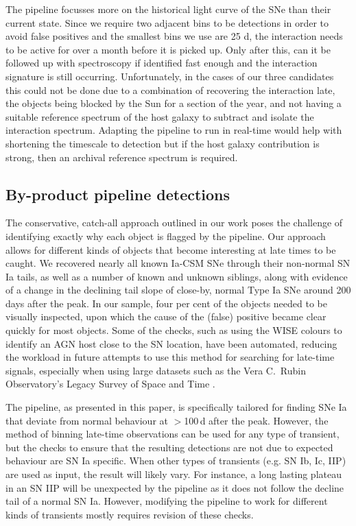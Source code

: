 \documentclass[a4paper,oneside,12pt, class=Latex/Classes/PhDthesisPSnPDF, crop=false]{standalone}
\begin{document}
The pipeline focusses more on the historical light curve of the SNe than their current state. Since we require two adjacent bins to be detections in order to avoid false positives and the smallest bins we use are 25 d, the interaction needs to be active for over a month before it is picked up. Only after this, can it be followed up with spectroscopy if identified fast enough and the interaction signature is still occurring. Unfortunately, in the cases of our three candidates this could not be done due to a combination of recovering the interaction late, the objects being blocked by the Sun for a section of the year, and not having a suitable reference spectrum of the host galaxy to subtract and isolate the interaction spectrum. Adapting the pipeline to run in real-time would help with shortening the timescale to detection but if the host galaxy contribution is strong, then an archival reference spectrum is required.

\subsection{By-product pipeline detections}
The conservative, catch-all approach outlined in our work poses the challenge of identifying exactly why each object is flagged by the pipeline. Our approach allows for different kinds of objects that become interesting at late times to be caught. We recovered nearly all known Ia-CSM SNe through their non-normal SN Ia tails, as well as a number of known and unknown siblings, along with evidence of a change in the declining tail slope of close-by, normal Type Ia SNe around 200 days after the peak. In our sample, four per cent of the objects needed to be visually inspected, upon which the cause of the (false) positive became clear quickly for most objects. Some of the checks, such as using the WISE colours to identify an AGN host close to the SN location, have been automated, reducing the workload in future attempts to use this method for searching for late-time signals, especially when using large datasets such as the Vera C.~Rubin Observatory's Legacy Survey of Space and Time \cite[LSST;][]{LSST}.

The pipeline, as presented in this paper, is specifically tailored for finding SNe Ia that deviate from normal behaviour at $>$100\,d after the peak. However, the method of binning late-time observations can be used for any type of transient, but the checks to ensure that the resulting detections are not due to expected behaviour are SN Ia specific. When other types of transients (e.g. SN Ib, Ic, IIP) are used as input, the result will likely vary. For instance, a long lasting plateau in an SN IIP will be unexpected by the pipeline as it does not follow the decline tail of a normal SN Ia. However, modifying the pipeline to work for different kinds of transients mostly requires revision of these checks.
\end{document}
